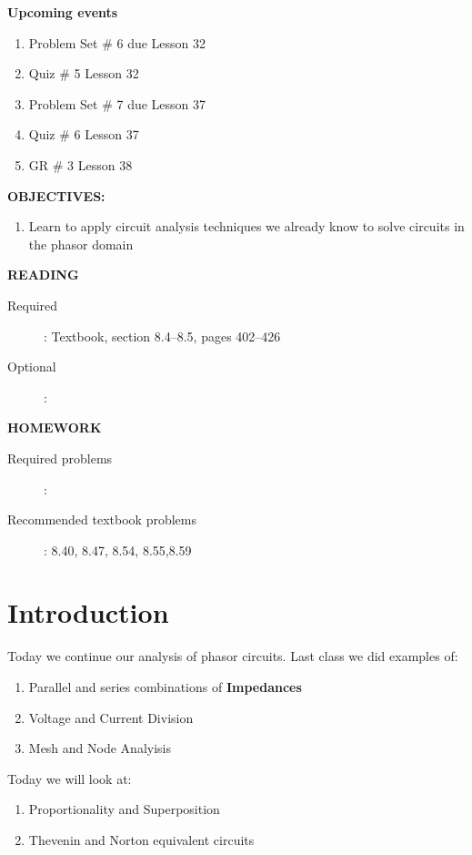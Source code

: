 \documentclass{handout}
\begin{document}
\maketitle

\textbf{Upcoming events}
\begin{enumerate}
\item Problem Set \# 6 due Lesson 32
\item Quiz \# 5 Lesson 32
\item Problem Set \# 7 due Lesson 37
\item Quiz \# 6 Lesson 37
\item GR \# 3 Lesson 38
\end{enumerate}

\textbf{OBJECTIVES:}
\begin{enumerate}
\item Learn to apply circuit analysis techniques we already know to solve circuits in the phasor domain
\end{enumerate}

\textbf{READING}
\begin{description}
\item [Required]:
Textbook, section 8.4--8.5, pages 402--426
\item [Optional]: 
\end{description}

\textbf{HOMEWORK}
\begin{description}
\item [Required problems]: 
\item [Recommended textbook problems]: 8.40, 8.47, 8.54, 8.55,8.59
\end{description}

\section{Introduction}
Today we continue our analysis of phasor circuits.  Last class we did examples of:
\begin{enumerate}
\item Parallel and series combinations of \textbf{Impedances}
\item Voltage and Current Division
\item Mesh and Node Analyisis
\end{enumerate}

Today we will look at:
\begin{enumerate}
\item Proportionality and Superposition
\item Thevenin and Norton equivalent circuits
\end{enumerate}
\end{document}
